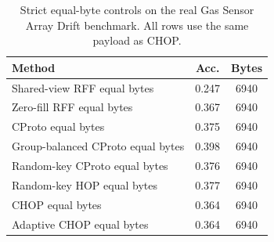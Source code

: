 \begin{table}[t]
\centering
\caption{Strict equal-byte controls on the real Gas Sensor Array Drift benchmark. All rows use the same payload as CHOP.}
\label{tab:strict-equal-byte-gas-drift-temporal}
\begin{tabular}{lcc}
\toprule
Method & Acc. & Bytes \\
\midrule
Shared-view RFF equal bytes & 0.247 & 6940 \\
Zero-fill RFF equal bytes & 0.367 & 6940 \\
CProto equal bytes & 0.375 & 6940 \\
Group-balanced CProto equal bytes & 0.398 & 6940 \\
Random-key CProto equal bytes & 0.376 & 6940 \\
Random-key HOP equal bytes & 0.377 & 6940 \\
CHOP equal bytes & 0.364 & 6940 \\
Adaptive CHOP equal bytes & 0.364 & 6940 \\
\bottomrule
\end{tabular}
\end{table}
